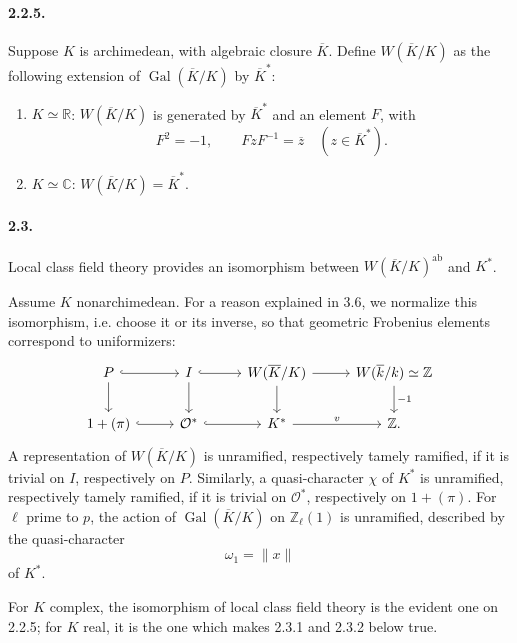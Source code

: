 \documentclass[10pt]{article}
\newcommand{\C}{\mathbb C}
\newcommand{\Z}{\mathbb Z}
\newcommand{\Gal}{\operatorname{Gal}}
\providecommand{\ab}{\mathrm{ab}}
\providecommand{\R}{\mathbb R}
\providecommand{\ab}{\mathrm{ab}}
\begin{document}
\paragraph{2.2.5.} Suppose \(K\) is archimedean, with algebraic closure \(\overline K\). Define \(W(\overline K/K)\) as the following extension of \(\Gal(\overline K/K)\) by \(\overline K^*\):
\begin{enumerate}[label=\arabic*)]
\item \(K\simeq\R\): \(W(\overline K/K)\) is generated by \(\overline K^*\) and an element \(F\), with
\[
F^2=-1,\qquad FzF^{-1}=\overline z\quad(z\in\overline K^*).
\]
\item \(K\simeq\C\): \(W(\overline K/K)=\overline K^*\).
\end{enumerate}

\paragraph{2.3.} Local class field theory provides an isomorphism between \(W(\overline K/K)^{\ab}\) and \(K^*\).

Assume \(K\) nonarchimedean. For a reason explained in 3.6, we normalize this isomorphism, i.e. choose it or its inverse, so that geometric Frobenius elements correspond to uniformizers:
\[
\begin{tikzcd}[column sep=2.7em,row sep=1.9em]
P \arrow[r,hook] \arrow[d] & I \arrow[r,hook] \arrow[d] &
W(\overline K/K) \arrow[r] \arrow[d] &
W(\overline k/k)\simeq\Z \arrow[d,"{-1}"]\\
1+(\pi) \arrow[r,hook] & \mathcal O^* \arrow[r,hook] &
K^* \arrow[r,"v"] & \Z .
\end{tikzcd}
\]
A representation of \(W(\overline K/K)\) is unramified, respectively tamely ramified, if it is trivial on \(I\), respectively on \(P\). Similarly, a quasi-character \(\chi\) of \(K^*\) is unramified, respectively tamely ramified, if it is trivial on \(\mathcal O^*\), respectively on \(1+(\pi)\). For \(\ell\) prime to \(p\), the action of \(\Gal(\overline K/K)\) on \(\Z_\ell(1)\) is unramified, described by the quasi-character
\[
\omega_1=\|x\|
\]
of \(K^*\).

For \(K\) complex, the isomorphism of local class field theory is the evident one on 2.2.5; for \(K\) real, it is the one which makes 2.3.1 and 2.3.2 below true.
\end{document}
